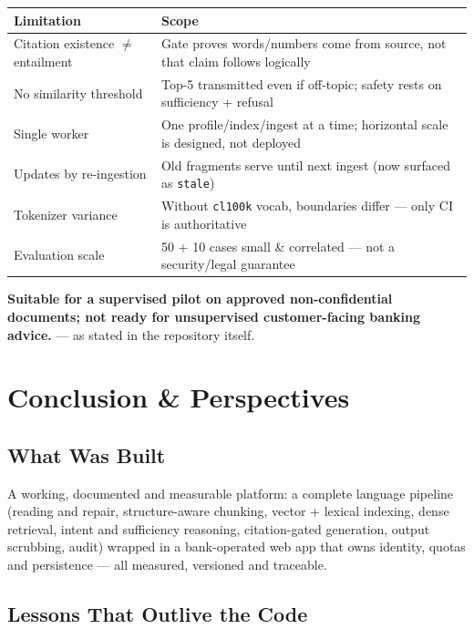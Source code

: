\documentclass[a4paper,12pt]{report}
\begin{document}
\begin{table}[H]
\centering\footnotesize
\begin{tabular}{p{4.8cm}p{9.6cm}}
\toprule
\textbf{Limitation} & \textbf{Scope} \\
\midrule
Citation existence $\neq$ entailment & Gate proves words/numbers come from source, not that claim follows logically \\
No similarity threshold & Top-5 transmitted even if off-topic; safety rests on sufficiency + refusal \\
Single worker & One profile/index/ingest at a time; horizontal scale is designed, not deployed \\
Updates by re-ingestion & Old fragments serve until next ingest (now surfaced as \texttt{stale}) \\
Tokenizer variance & Without \texttt{cl100k} vocab, boundaries differ --- only CI is authoritative \\
Evaluation scale & 50 + 10 cases small \& correlated --- not a security/legal guarantee \\
\bottomrule
\end{tabular}
\end{table}

\begin{center}
\small\color{abarakaRed}\textbf{Suitable for a supervised pilot on approved non-confidential documents; not ready for unsupervised customer-facing banking advice.} --- as stated in the repository itself.
\end{center}

\chapter{Conclusion \& Perspectives}

\section{What Was Built}

A working, documented and measurable platform: a complete language pipeline (reading and repair, structure-aware chunking, vector + lexical indexing, dense retrieval, intent and sufficiency reasoning, citation-gated generation, output scrubbing, audit) wrapped in a bank-operated web app that owns identity, quotas and persistence --- all measured, versioned and traceable.

\section{Lessons That Outlive the Code}
\end{document}
